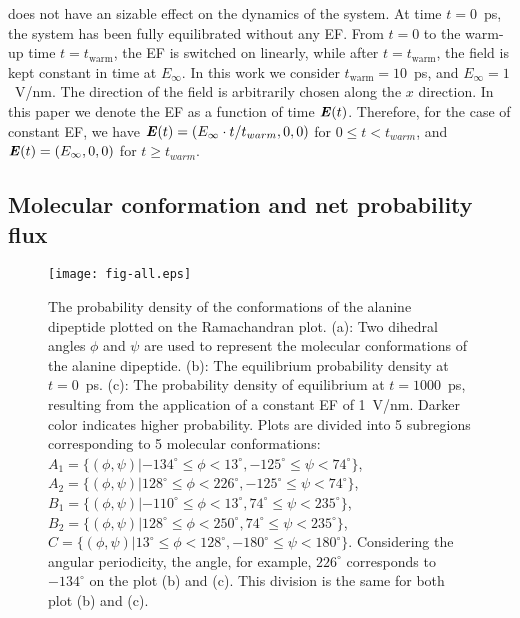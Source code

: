 \documentclass[a4paper,preprint,unsortedaddress,onecolumn]{revtex4-1}
\newcommand{\vect}[1]{\textbf{\textit{#1}}}
\begin{document}
does not have an sizable effect on the
dynamics of the system.
At time $t=0$~ps, the system
has been fully equilibrated without any EF. From $t=0$ to
the warm-up time $t=t_{\textrm{warm}}$, the EF is switched on linearly, while
after $t=t_{\textrm{warm}}$, the field is kept constant in time at
$E_{\infty}$.  In this work we consider $t_{\textrm{warm}} = 10$~ps,
and $E_{\infty} = 1$~V/nm.
The direction of the field is arbitrarily chosen along the
$x$ direction.
In this paper we denote the
EF as a function of time $\vect E(t)$.
Therefore, for the case of constant EF, we have
$\vect E(t) = (E_\infty\cdot t/t_{warm},0,0)$ for $0\leq t < t_{warm}$, and 
$\vect E(t) = (E_\infty,0,0)$
for $t \geq t_{warm}$.


\subsection{Molecular conformation and net probability flux}

\begin{figure}
  \centering
  \texttt{[image: fig-all.eps]}
  \caption{
    The probability density of the conformations of the alanine dipeptide plotted on the Ramachandran plot.
    (a): Two dihedral angles
    $\phi$ and $\psi$ are used to represent the molecular conformations of the alanine dipeptide.
    (b): The equilibrium probability density 
    at $t=0$~\textsf{ps}. (c): The probability density of equilibrium at $t=1000$~\textsf{ps}, resulting from the application of a constant EF of 1~V/nm. Darker color
    indicates higher probability.
    Plots are divided into 5 subregions corresponding
    to 5 molecular conformations:
    $A_1 = \{(\phi, \psi) | -134^\circ \leq \phi <  13^\circ, -125^\circ \leq \psi < 74^\circ\}$,
    $A_2 = \{(\phi, \psi) |  128^\circ \leq \phi < 226^\circ, -125^\circ \leq \psi < 74^\circ\}$,
    $B_1 = \{(\phi, \psi) | -110^\circ \leq \phi <  13^\circ,   74^\circ \leq \psi < 235^\circ\}$,
    $B_2 = \{(\phi, \psi) |  128^\circ \leq \phi < 250^\circ,   74^\circ \leq \psi < 235^\circ\}$,
    $C   = \{(\phi, \psi) |   13^\circ \leq \phi < 128^\circ, -180^\circ \leq \psi < 180^\circ\}$.
    Considering the angular periodicity, the angle, for example, $226^\circ$ corresponds to $-134^\circ$
    on the plot (b) and (c).
    This division is the same for both plot (b) and (c).
  }
  \label{fig:tmp4}
\end{figure}
\end{document}
